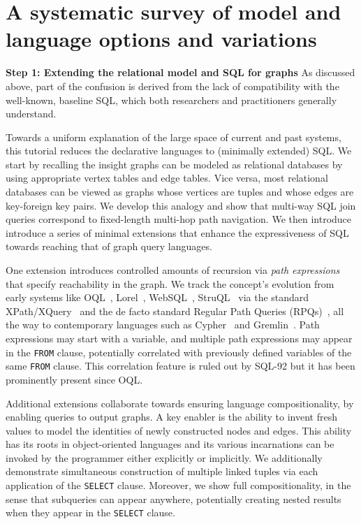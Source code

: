 \section{A systematic survey of model and language options and variations}

\noindent \textbf{Step 1: Extending the relational model and SQL for graphs} As discussed above, part of the confusion is derived from the lack of compatibility with the well-known, baseline SQL, which both researchers and practitioners generally understand.

Towards a uniform explanation of the large space of current and past systems, this tutorial reduces the declarative languages to (minimally extended) SQL.
We start by recalling the insight graphs can be modeled as relational databases by using appropriate vertex tables and edge tables. Vice versa, most relational databases can be viewed as graphs whose vertices are tuples and whose edges are key-foreign key pairs. We develop this analogy and show that multi-way SQL join queries correspond to fixed-length multi-hop path navigation. We then introduce introduce a series of minimal extensions that enhance the expressiveness of SQL towards reaching that of graph query languages.

One extension introduces controlled amounts of recursion via {\em path expressions} that specify reachability 
in the graph. We track the concept's evolution from early systems like OQL~\cite{oql-dbpl-1989},
Lorel~\cite{lorel}, WebSQL~\cite{websql}, StruQL~\cite{struql} via the standard XPath/XQuery~\cite{XQuery}
and the de facto standard Regular Path Queries (RPQs)~\cite{crpqs}, all the way to
contemporary languages such as Cypher~\cite{cypher} and Gremlin~\cite{gremlin}.
Path expressions may start with a variable, and multiple path expressions may appear in the \texttt{FROM} clause, potentially
correlated with previously defined variables of the same \texttt{FROM} clause. This correlation feature is ruled out by SQL-92 but it has been prominently present since OQL.

Additional extensions collaborate towards ensuring language compositionality, by enabling queries to output graphs.
A key enabler is the ability to invent fresh values to model the identities of newly constructed nodes and edges. This ability has its roots in object-oriented languages and its various incarnations can be invoked by the programmer either explicitly or implicitly.
We additionally demonstrate simultaneous construction of multiple linked tuples via each application of the \texttt{SELECT} clause.
Moreover, we show full compositionality, in the sense that subqueries can appear anywhere, potentially creating nested results when they appear in the \texttt{SELECT} clause.

